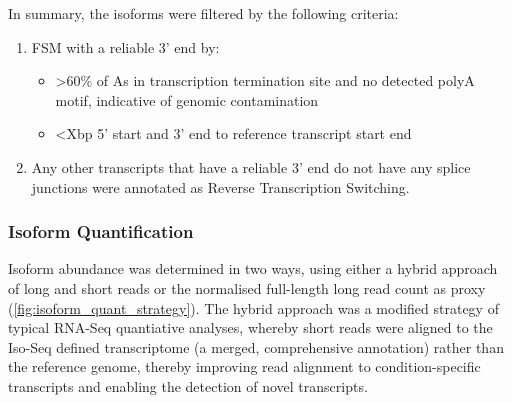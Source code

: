 
In summary, the isoforms were filtered by the following criteria: 
\begin{enumerate}
	\item FSM with a reliable 3’ end by:
	\begin{itemize}
		\item >60\% of As in transcription termination site and no detected polyA motif, indicative of genomic contamination
		\item <Xbp 5' start and 3’ end to reference transcript start end
	\end{itemize}
	\item Any other transcripts that have a reliable 3' end do not have any splice junctions were annotated as Reverse Transcription Switching. 
\end{enumerate}

\subsubsection{Isoform Quantification}
Isoform abundance was determined in two ways, using either a hybrid approach of long and short reads or the normalised full-length long read count as proxy (\cref{fig:isoform_quant_strategy}). The hybrid approach was a modified strategy of typical RNA-Seq quantiative analyses, whereby short reads were aligned to the Iso-Seq defined transcriptome (a merged, comprehensive annotation) rather than the reference genome, thereby improving read alignment to condition-specific transcripts and enabling the detection of novel transcripts. 


